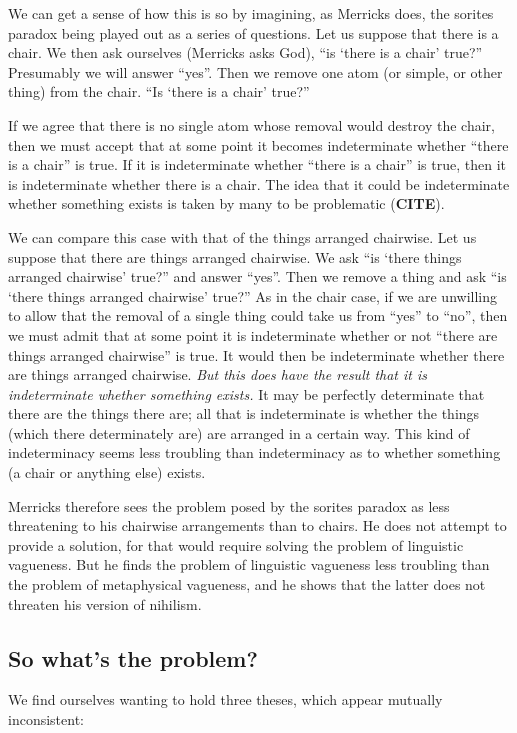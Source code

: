 \documentclass[11pt]{article}
\begin{document}
\begin{spacing}{1.5}
We can get a sense of how this is so by imagining, as Merricks does,
the sorites paradox being played out as a series of questions.  Let us
suppose that there is a chair.  We then ask ourselves (Merricks asks
God), ``is `there is a chair' true?''  Presumably we will answer
``yes''.  Then we remove one atom (or simple, or other thing) from the
chair.  ``Is `there is a chair' true?''

If we agree that there is no single atom whose removal would destroy
the chair, then we must accept that at some point it becomes
indeterminate whether ``there is a chair'' is true.  If it is
indeterminate whether ``there is a chair'' is true, then it is
indeterminate whether there is a chair.  The idea that it could be
indeterminate whether something exists is taken by many to be
problematic (\textbf{CITE}).

We can compare this case with that of the things arranged chairwise.
Let us suppose that there are things arranged chairwise.  We ask ``is
`there things arranged chairwise' true?'' and answer ``yes''.  Then we
remove a thing and ask ``is `there things arranged chairwise' true?''
As in the chair case, if we are unwilling to allow that the removal of
a single thing could take us from ``yes'' to ``no'', then we must
admit that at some point it is indeterminate whether or not ``there
are things arranged chairwise'' is true.  It would then be
indeterminate whether there are things arranged chairwise.  {\em But
  this does have the result that it is indeterminate whether something
  exists.}  It may be perfectly determinate that there are the things
there are; all that is indeterminate is whether the things (which
there determinately are) are arranged in a certain way.  This kind of
indeterminacy seems less troubling than indeterminacy as to whether
something (a chair or anything else) exists.

Merricks therefore sees the problem posed by the sorites paradox as
less threatening to his chairwise arrangements than to chairs.  He
does not attempt to provide a solution, for that would require solving
the problem of linguistic vagueness.  But he finds the problem of
linguistic vagueness less troubling than the problem of metaphysical
vagueness, and he shows that the latter does not threaten his version
of nihilism.

\subsection{So what's the problem?}
\label{sorites-3}
We find ourselves wanting to hold three theses, which appear mutually
inconsistent:


\end{spacing}
\end{document}
